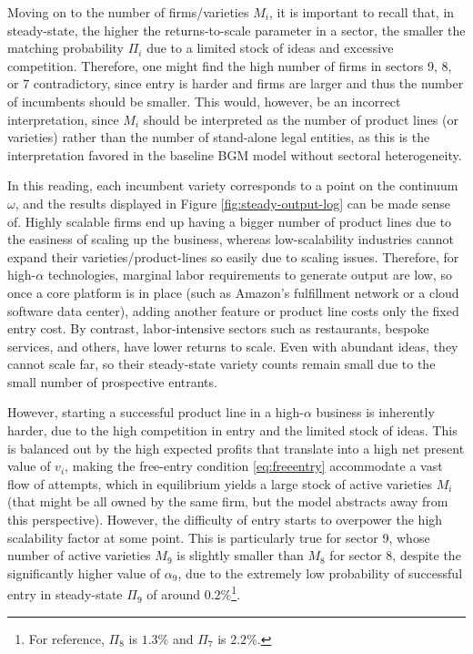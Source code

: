 \documentclass[a4paper,12pt]{article} %
\numberwithin{equation}{section} %
\numberwithin{figure}{section}
\numberwithin{table}{section}
\begin{document}
Moving on to the number of firms/varieties $M_i$, it is important to recall that, in steady-state, the higher the returns-to-scale parameter
in a sector, the smaller the matching probability $\Pi_i$ due to a limited stock of ideas and excessive competition. Therefore, one might find
the high number of firms in sectors 9, 8, or 7 contradictory, since entry is harder and firms are larger and thus the number of incumbents should
be smaller. This would, however, be an incorrect interpretation, since $M_i$ should be interpreted as the number of product lines (or varieties) 
rather than the number of stand-alone legal entities, as this is the interpretation favored in the baseline BGM model without 
sectoral heterogeneity. 

In this reading, each incumbent variety corresponds to a point on the continuum $\omega$, and the results displayed in 
Figure \ref{fig:steady-output-log} can be made sense of. Highly scalable firms end up having a bigger number of product lines due to the
easiness of scaling up the business, whereas low-scalability industries cannot expand their varieties/product-lines so easily due 
to scaling issues. Therefore, for high-$\alpha$ technologies, marginal labor requirements to generate output are low, so once a 
core platform is in place (such as Amazon's fulfillment network or a cloud software data center), adding another feature or product line costs
only the fixed entry cost. By contrast, labor-intensive sectors such as restaurants, bespoke services, and others, have lower returns to scale. Even with abundant ideas,
they cannot scale far, so their steady-state variety counts remain small due to the small number of prospective entrants.

However, starting a successful product line in a high-$\alpha$ business is inherently harder, due to the high competition in entry and the 
limited stock of ideas. This is balanced out by the high expected profits that translate into a high net present value of $v_i$,
making the free-entry condition \eqref{eq:freeentry} accommodate a vast flow of attempts, which in equilibrium yields a large stock
of active varieties $M_i$ (that might be all owned by the same firm, but the model abstracts away from this perspective). However, the difficulty of
entry starts to overpower the high scalability factor at some point. This is particularly true for sector 9, whose number of active varieties $M_9$ is slightly
smaller than $M_8$ for sector 8, despite the significantly higher value of $\alpha_9$, due to the extremely low probability of successful entry in 
steady-state $\Pi_9$ of around $0.2\%$\footnote{For reference, $\Pi_8$ is $1.3\%$ and $\Pi_7$ is $2.2\%$.}.
\end{document}
